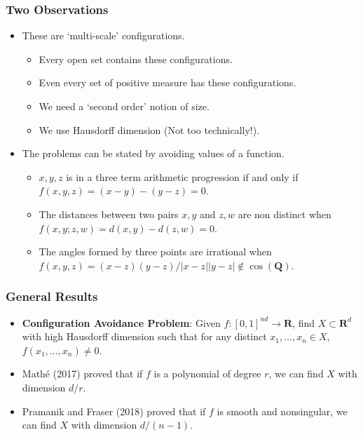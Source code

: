 \documentclass{beamer}
\begin{document}
\begin{frame}
    \frametitle{Two Observations}

    \begin{itemize}
        \item These are `multi-scale' configurations.
        \pause

        \begin{itemize}
        \item Every open set contains these configurations.
        \pause

        \item Even every set of positive measure has these configurations.
        \pause

        \item We need a `second order' notion of size.
        \pause

        \item We use Hausdorff dimension (Not too technically!).
        \pause
    \end{itemize}

        \item The problems can be stated by avoiding values of a function.
        \pause
        \begin{itemize}
            \item $x,y,z$ is in a three term arithmetic progression if and only if $f(x,y,z) = (x - y) - (y - z) = 0$.
            \pause

            \item The distances between two pairs $x,y$ and $z,w$ are non distinct when $f(x,y;z,w) = d(x,y) - d(z,w) = 0$.
            \pause

            \item The angles formed by three points are irrational when $f(x,y,z) = (x - z)(y - z)/|x-z||y-z| \not \in \cos(\mathbf{Q})$.
        \end{itemize}
    \end{itemize}
\end{frame}

\begin{frame}
    \frametitle{General Results}

    \begin{itemize}
        \item {\bf Configuration Avoidance Problem}: Given $f: [0,1]^{nd} \to \mathbf{R}$, find $X \subset \mathbf{R}^d$ with high Hausdorff dimension such that for any distinct $x_1, \dots, x_n \in X$, $f(x_1, \dots, x_n) \neq 0$.
        \pause

        \item Math\'{e} (2017) proved that if $f$ is a polynomial of degree $r$, we can find $X$ with dimension $d/r$.
        \pause

        \item Pramanik and Fraser (2018) proved that if $f$ is smooth and nonsingular, we can find $X$ with dimension $d/(n-1)$.
    \end{itemize}
\end{frame}
\end{document}
